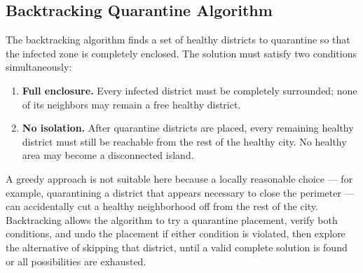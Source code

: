 \documentclass[12pt, a4paper]{article}
\begin{document}
\subsection{Backtracking Quarantine Algorithm}

The backtracking algorithm finds a set of healthy districts to quarantine
so that the infected zone is completely enclosed. The solution must satisfy
two conditions simultaneously:

\begin{enumerate}
  \item \textbf{Full enclosure.} Every infected district must be completely
        surrounded; none of its neighbors may remain a free healthy district.
  \item \textbf{No isolation.} After quarantine districts are placed, every
        remaining healthy district must still be reachable from the rest of
        the healthy city. No healthy area may become a disconnected island.
\end{enumerate}

A greedy approach is not suitable here because a locally reasonable choice
--- for example, quarantining a district that appears necessary to close the
perimeter --- can accidentally cut a healthy neighborhood off from the rest
of the city. Backtracking allows the algorithm to try a quarantine placement,
verify both conditions, and undo the placement if either condition is
violated, then explore the alternative of skipping that district, until a
valid complete solution is found or all possibilities are exhausted.
\end{document}

